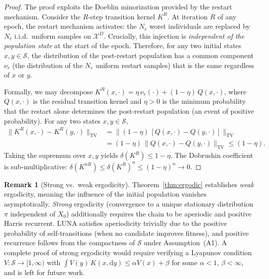 \documentclass[review]{elsarticle}
\theoremstyle{definition}
\newtheorem{remark}{Remark}
\begin{document}
\begin{proof}
The proof exploits the Doeblin minorization provided by the restart mechanism. Consider the $R$-step transition kernel $K^R$. At iteration $R$ of any epoch, the restart mechanism activates: the $N_r$ worst individuals are replaced by $N_r$ i.i.d.\ uniform samples on $\mathcal{X}^D$. Crucially, this injection is \emph{independent of the population state} at the start of the epoch. Therefore, for any two initial states $x,y\in\mathcal{S}$, the distribution of the post-restart population has a common component $\nu_r$ (the distribution of the $N_r$ uniform restart samples) that is the same regardless of $x$ or $y$.

Formally, we may decompose $K^R(x,\cdot)=\eta\,\nu_r(\cdot)+(1-\eta)\,Q(x,\cdot)$, where $Q(x,\cdot)$ is the residual transition kernel and $\eta>0$ is the minimum probability that the restart alone determines the post-restart population (an event of positive probability). For any two states $x,y\in\mathcal{S}$,
\begin{align*}
\|K^R(x,\cdot)-K^R(y,\cdot)\|_{\mathrm{TV}}&=\bigl\|(1-\eta)\,[Q(x,\cdot)-Q(y,\cdot)]\bigr\|_{\mathrm{TV}}\\
&=(1-\eta)\,\|Q(x,\cdot)-Q(y,\cdot)\|_{\mathrm{TV}}\le(1-\eta).
\end{align*}
Taking the supremum over $x,y$ yields $\delta(K^R)\le 1-\eta$. The Dobrushin coefficient is sub-multiplicative: $\delta(K^{nR})\le\delta(K^R)^n\le(1-\eta)^n\to 0$.
\end{proof}

\begin{remark}[Strong vs.\ weak ergodicity]
Theorem~\ref{thm:ergodic} establishes \emph{weak} ergodicity, meaning the influence of the initial population vanishes asymptotically. \emph{Strong} ergodicity (convergence to a unique stationary distribution $\pi$ independent of $X_0$) additionally requires the chain to be aperiodic and positive Harris recurrent. LUNA satisfies aperiodicity trivially due to the positive probability of self-transitions (when no candidate improves fitness), and positive recurrence follows from the compactness of $\mathcal{S}$ under Assumption~(A1). A complete proof of strong ergodicity would require verifying a Lyapunov condition $V:\mathcal{S}\to[1,\infty)$ with $\int V(y)\,K(x,\mathrm{d}y)\le\alpha V(x)+\beta$ for some $\alpha<1$, $\beta<\infty$, and is left for future work.
\end{remark}

\end{document}
